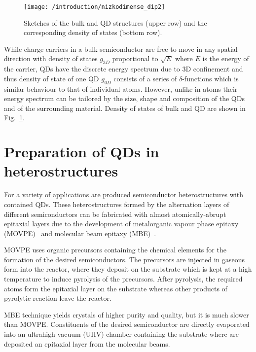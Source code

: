 \documentclass[
a4paper, %
11pt, %
onecolumn, %
openany, %
oldfontcommands,
]{memoir}
\begin{document}
%
\begin{figure}
	\centering
	\texttt{[image: /introduction/nizkodimense\_dip2]}
	\caption{Sketches of the bulk and QD structures (upper row) and the corresponding density of states (bottom row).}
	\label{fig:intr:nizkodimenze}
\end{figure}
%
While charge carriers in a bulk semiconductor are free to move in any spatial direction with density of states $g_{3D}$ proportional to $\sqrt{E}$ where $E$ is the energy of the carrier, QDs have the discrete energy spectrum due to 3D confinement and thus density of state of one QD $g_{0D}$ consists of a series of $\delta$-functions which is similar behaviour to that of individual atoms. However, unlike in atoms their energy spectrum can be tailored by the size, shape and composition of the QDs and of the surrounding material. Density of states of bulk and QD are shown in Fig.~\ref{fig:intr:nizkodimenze}.

\section{Preparation of QDs in heterostructures}
For a variety of applications are produced semiconductor heterostructures with contained QDs. These heterostructures formed by the alternation layers of different semiconductors can be fabricated with almost atomically-abrupt epitaxial layers due to the development of metalorganic vapour phase epitaxy (MOVPE)~\cite{Stringfellow,MOVPE_May} and molecular beam epitaxy (MBE)~\cite{Stringfellow,MOVPE_May}.

MOVPE uses organic precursors containing the chemical elements for the formation of the desired semiconductors. The precursors are injected in gaseous form into the reactor, where they deposit on the substrate which is kept at a high temperature to induce pyrolysis of the precursors. After pyrolysis, the required atoms form the epitaxial layer on the substrate whereas other products of pyrolytic reaction leave the reactor.



MBE technique yields crystals of higher purity and quality, but it is much slower than MOVPE. Constituents of the desired semiconductor are directly evaporated into an ultrahigh vacuum (UHV) chamber containing the substrate where are deposited an epitaxial layer from the molecular beams.
\end{document}
